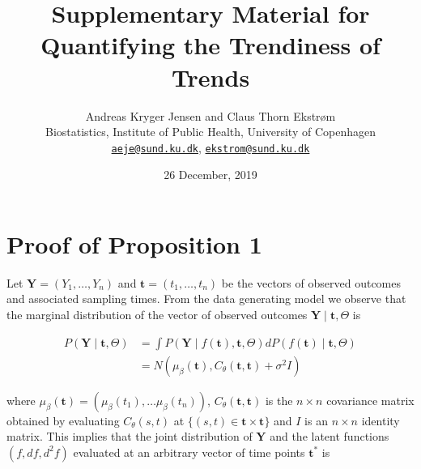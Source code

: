 \documentclass[11pt,]{article}
\title{Supplementary Material for\\
Quantifying the Trendiness of Trends}
\author{Andreas Kryger Jensen and Claus Thorn Ekstrøm\\
Biostatistics, Institute of Public Health, University of Copenhagen\\
\href{mailto:aeje@sund.ku.dk}{\nolinkurl{aeje@sund.ku.dk}},
\href{mailto:ekstrom@sund.ku.dk}{\nolinkurl{ekstrom@sund.ku.dk}}}
\date{26 December, 2019}
\theoremstyle{nonumberplain}
\begin{document}
\maketitle

\appendix

\section{Proof of Proposition 1}\label{sec:appendix1}

Let \(\mathbf{Y} = (Y_1, \ldots, Y_n)\) and
\(\mathbf{t} = (t_1, \ldots, t_n)\) be the vectors of observed outcomes
and associated sampling times. From the data generating model we observe
that the marginal distribution of the vector of observed outcomes
\(\mathbf{Y} \mid \mathbf{t}, \Theta\) is

\begin{align*}
P(\mathbf{Y} \mid \mathbf{t}, \Theta) &= \int P(\mathbf{Y} \mid f(\mathbf{t}), \mathbf{t}, \Theta)dP(f(\mathbf{t}) \mid \mathbf{t}, \Theta)\\
  &= N(\mu_\beta(\mathbf{t}), C_\theta(\mathbf{t}, \mathbf{t}) + \sigma^2 I)
\end{align*}

where
\(\mu_\beta(\mathbf{t}) = (\mu_\beta(t_1), \ldots \mu_\beta(t_n))\),
\(C_\theta(\mathbf{t}, \mathbf{t})\) is the \(n \times n\) covariance
matrix obtained by evaluating \(C_\theta(s,t)\) at
\(\{(s,t) \in \mathbf{t} \times \mathbf{t}\}\) and \(I\) is an
\(n \times n\) identity matrix. This implies that the joint distribution
of \(\mathbf{Y}\) and the latent functions \((f, df, d^2\!f)\) evaluated
at an arbitrary vector of time points \(\mathbf{t}^\ast\) is
\end{document}
